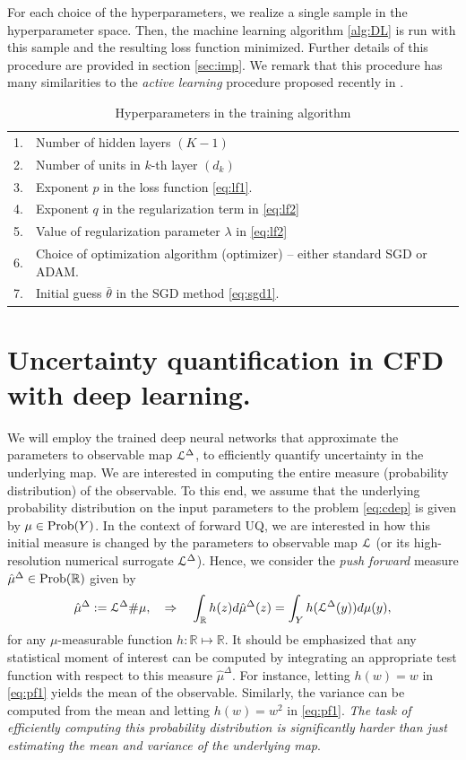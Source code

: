 \documentclass[a4paper]{article}
\numberwithin{equation}{section}
\numberwithin{equation}{section}
\theoremstyle{definition}
\theoremstyle{myremarkstyle}
\newcommand{\R}{\mathbb{R}}
\newcommand{\map}{\EuScript{L}}
\begin{document}
For each choice of the hyperparameters, we realize a single sample in the hyperparameter space. Then, the machine learning algorithm \ref{alg:DL} is run with this sample and the resulting loss function minimized. Further details of this procedure are provided in section \ref{sec:imp}. We remark that this procedure has many similarities to the \emph{active learning} procedure proposed recently in \cite{E4}. 
\begin{table}[htbp]
\centering
\begin{tabular}{ll}

1. & Number of hidden layers $(K-1)$ \\
2. & Number of units in $k$-th layer $(d_k)$ \\
3. & Exponent $p$ in the loss function \eqref{eq:lf1}. \\
4. & Exponent $q$ in the regularization term in \eqref{eq:lf2} \\
5. & Value of regularization parameter $\lambda$ in \eqref{eq:lf2} \\
6. & Choice of optimization algorithm (optimizer) -- either standard SGD or ADAM. \\
7. & Initial guess $\bar{\theta}$ in the SGD method \eqref{eq:sgd1}. 
\end{tabular}
\caption{Hyperparameters in the training algorithm}
\label{tab:1}
\end{table}
\section{Uncertainty quantification in CFD with deep learning.}
\label{sec:3}
We will employ the trained deep neural networks that approximate the parameters to observable map $\map^{\Delta}$, to efficiently quantify uncertainty in the underlying map. We are interested in computing the entire measure (probability distribution) of the observable. To this end, we assume that the underlying probability distribution on the input parameters to the problem \eqref{eq:cdep} is given by $\mu \in {\rm Prob}(Y)$. In the context of forward UQ, we are interested in how this initial measure is changed by the parameters to observable map $\map$ (or its high-resolution numerical surrogate $\map^{\Delta}$). Hence, we consider the \emph{push forward} measure $\hat{\mu}^{\Delta} \in {\rm Prob}(\R)$ given by 
\begin{equation}
\label{eq:pf1} 
\hat{\mu}^{\Delta} := \map^{\Delta}\#\mu, \quad \Rightarrow \quad \int_{\R} h(z) d\hat{\mu}^{\Delta}(z) = \int_{Y} h(\map^{\Delta}(y)) d\mu(y), 
\end{equation}
for any $\mu$-measurable function $h:\R \mapsto \R$. It should be emphasized that any statistical moment of interest can be computed by integrating an appropriate test function with respect to this measure $\hat{\mu}^{\Delta}$. For instance, letting $h(w) = w$ in \eqref{eq:pf1} yields the mean of the observable. Similarly, the variance can be computed from the mean and letting $h(w) = w^2$ in \eqref{eq:pf1}. \emph{The task of efficiently computing this probability distribution is significantly harder than just estimating the mean and variance of the underlying map}.
\end{document}
